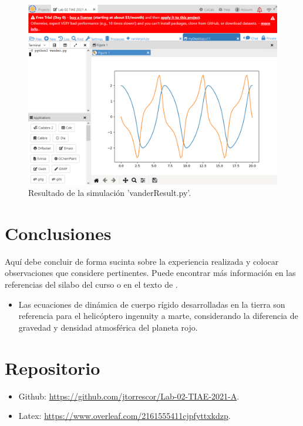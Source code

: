 \documentclass[12pt,oneside,spanish]{article}
\begin{document}
\begin{figure}
    \centering
    \includegraphics[width=12cm]{vanderResult.png}
    \caption{Resultado de la simulación 'vanderResult.py'.}
    \label{fig:vanderResult}
\end{figure}

\section{Conclusiones}
Aquí debe concluir de forma sucinta sobre la experiencia realizada y colocar observaciones que considere pertinentes.
Puede encontrar más información en las referencias del silabo del curso o en el texto de \cite{Triantafyllou:2002,fossen:2011}.
\begin{itemize}
    \item Las ecuaciones de dinámica de cuerpo rígido desarrolladas en la tierra son referencia para el helicóptero ingenuity a marte, considerando la diferencia de gravedad y densidad atmosférica del planeta rojo.
\end{itemize}
\section{Repositorio}
\begin{itemize}
    \item Github: 
    \url{https://github.com/jtorrescor/Lab-02-TIAE-2021-A}.
    \item Latex: 
    \url{https://www.overleaf.com/2161555411cjpfyttxkdzp}.
\end{itemize}
\newpage
%

\appendix
\end{document}
